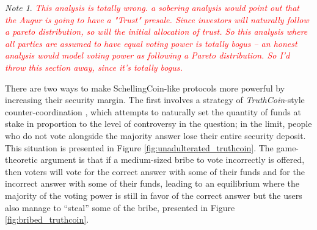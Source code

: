 \documentclass[11pt,a4paper]{report}
\newcommand{\comment}[1]{\textcolor{red}{\textit{#1}}}
\theoremstyle{plain}
\theoremstyle{definition}
\theoremstyle{remark}
\newtheorem*{note}{Note}
\begin{document}
\begin{note}

\comment{This analysis is totally wrong. a sobering analysis would point out that the Augur is going to have a "Trust" presale.  Since investors will naturally follow a pareto distribution, so will the initial allocation of trust.  So this analysis where all parties are assumed to have equal voting power is totally bogus -- an honest analysis would model voting power as following a Pareto distribution.  So I'd throw this section away, since it's totally bogus.}

There are two ways to make SchellingCoin-like protocols more powerful by increasing their security margin. The first involves a strategy of \emph{TruthCoin}-style counter-coordination \citep{sztorc_trustless_2014}, which attempts to naturally set the quantity of funds at stake in proportion to the level of controversy in the question; in the limit, people who do not vote alongside the majority answer lose their entire security deposit.  This situation is presented in Figure \ref{fig:unadulterated_truthcoin}. The game-theoretic argument is that if a medium-sized bribe to vote incorrectly is offered, then voters will vote for the correct answer with some of their funds and for the incorrect answer with some of their funds, leading to an equilibrium where the majority of the voting power is still in favor of the correct answer but the users also manage to ``steal'' some of the bribe, presented in Figure \ref{fig:bribed_truthcoin}.


\end{note}
\end{document}
